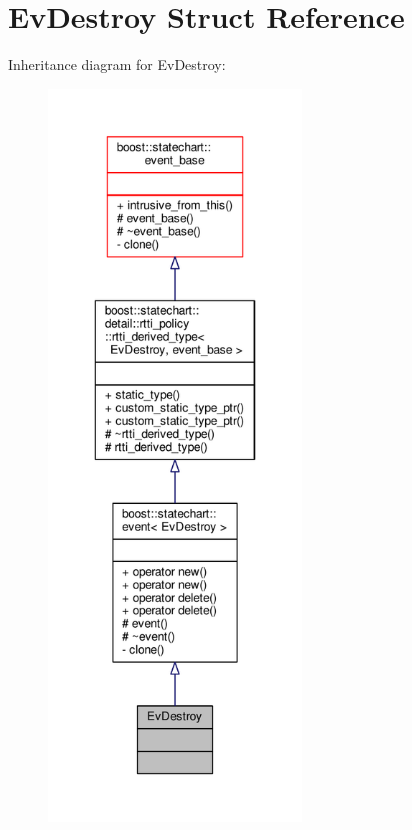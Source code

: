\hypertarget{struct_ev_destroy}{}\section{Ev\+Destroy Struct Reference}
\label{struct_ev_destroy}


Inheritance diagram for Ev\+Destroy\+:
\nopagebreak
\begin{figure}[H]
\begin{center}
\leavevmode
\includegraphics[height=550pt]{struct_ev_destroy__inherit__graph}
\end{center}
\end{figure}


